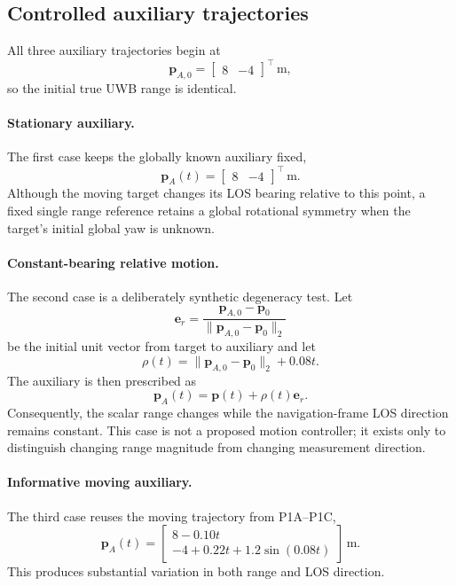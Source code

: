 \subsection{Controlled auxiliary trajectories}
All three auxiliary trajectories begin at
\begin{equation}
    \bm p_{A,0}=\begin{bmatrix}8&-4\end{bmatrix}^{\top}\,\mathrm{m},
\end{equation}
so the initial true UWB range is identical.

\paragraph{Stationary auxiliary.}
The first case keeps the globally known auxiliary fixed,
\begin{equation}
    \bm p_A(t)=\begin{bmatrix}8&-4\end{bmatrix}^{\top}\,\mathrm{m}.
\end{equation}
Although the moving target changes its LOS bearing relative to this point, a fixed single range reference retains a global rotational symmetry when the target's initial global yaw is unknown.

\paragraph{Constant-bearing relative motion.}
The second case is a deliberately synthetic degeneracy test. Let
\begin{equation}
    \bm e_r = \frac{\bm p_{A,0}-\bm p_0}{\lVert\bm p_{A,0}-\bm p_0\rVert_2}
\end{equation}
be the initial unit vector from target to auxiliary and let
\begin{equation}
    \rho(t)=\lVert\bm p_{A,0}-\bm p_0\rVert_2+0.08t.
\end{equation}
The auxiliary is then prescribed as
\begin{equation}
    \bm p_A(t)=\bm p(t)+\rho(t)\bm e_r.
\end{equation}
Consequently, the scalar range changes while the navigation-frame LOS direction remains constant. This case is not a proposed motion controller; it exists only to distinguish changing range magnitude from changing measurement direction.

\paragraph{Informative moving auxiliary.}
The third case reuses the moving trajectory from P1A--P1C,
\begin{equation}
    \bm p_A(t)=
    \begin{bmatrix}
        8-0.10t\\
        -4+0.22t+1.2\sin(0.08t)
    \end{bmatrix}\,\mathrm{m}.
\end{equation}
This produces substantial variation in both range and LOS direction.

